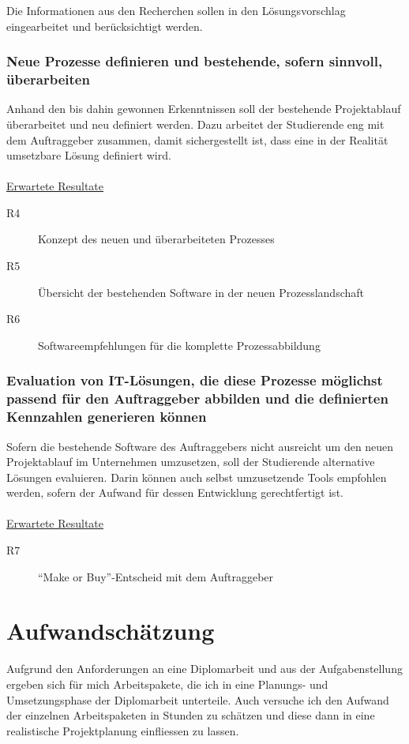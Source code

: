 Die Informationen aus den Recherchen sollen in den Lösungsvorschlag eingearbeitet
und berücksichtigt werden.

\subsubsection{Neue Prozesse definieren und bestehende, sofern sinnvoll, überarbeiten}
Anhand den bis dahin gewonnen Erkenntnissen soll der bestehende Projektablauf
überarbeitet und neu definiert werden. Dazu arbeitet der Studierende eng mit
dem Auftraggeber zusammen, damit sichergestellt ist, dass eine in der Realität
umsetzbare Lösung definiert wird.
\\\\
\underline{Erwartete Resultate}

\begin{description}
    \item[R4] Konzept des neuen und überarbeiteten Prozesses
    \item[R5] Übersicht der bestehenden Software in der neuen Prozesslandschaft
    \item[R6] Softwareempfehlungen für die komplette Prozessabbildung
\end{description}

\subsubsection{Evaluation von IT-Lösungen, die diese Prozesse möglichst passend 
    für den Auftraggeber abbilden und die definierten Kennzahlen generieren können}
Sofern die bestehende Software des Auftraggebers nicht ausreicht um den neuen
Projektablauf im Unternehmen umzusetzen, soll der Studierende alternative 
Lösungen evaluieren. Darin können auch selbst umzusetzende Tools empfohlen 
werden, sofern der Aufwand für dessen Entwicklung gerechtfertigt ist.
\\\\
\underline{Erwartete Resultate}

\begin{description}
    \item[R7] ``Make or Buy''-Entscheid mit dem Auftraggeber
\end{description}


\section{Aufwandschätzung}
Aufgrund den Anforderungen an eine Diplomarbeit und aus der Aufgabenstellung
ergeben sich für mich Arbeitspakete, die ich in eine Planungs- und Umsetzungsphase
der Diplomarbeit unterteile. Auch versuche ich den Aufwand der einzelnen
Arbeitspaketen in Stunden zu schätzen und diese dann in eine realistische 
Projektplanung einfliessen zu lassen.

